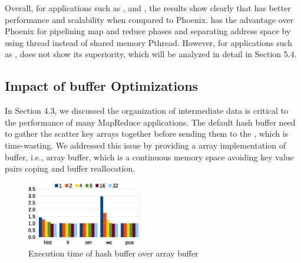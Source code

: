 Overall, for applications such as ,  and , the results show clearly that \myds has better performance and scalability when compared to Phoenix.
\myds has the advantage over Phoenix for pipelining map and reduce phases and separating address space by using \myth thread instead of shared memory Pthread. 
However, for applications such as , \myds does not show its superiority, which will be analyzed in detail in Section 5.4.

\subsection{Impact of buffer Optimizations}
In Section 4.3, we discussed the organization of intermediate data is critical to the performance of many MapReduce applications.
The default hash buffer need to gather the scatter key arrays together before sending them to the , which is time-wasting.
We addressed this issue by providing a array implementation of buffer, i.e., array buffer, which is a continuous memory space avoiding key value pairs coping and buffer reallocation.

\begin{figure}[!h!t]  
	\centering
	\includegraphics[width=0.45\textwidth]{eps/smr_diff_buffer.eps}
	\caption{Execution time of hash buffer over array buffer}
	\label{fig:smr:diff:buffer}
\end{figure}


